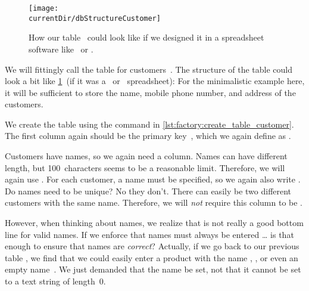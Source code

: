 %
%
%
\begin{figure}%
\centering%
\texttt{[image: \\currentDir/dbStructureCustomer]}%
\caption{How our table~ could look like if we designed it in a spreadsheet software like \microsoftExcel\ or \libreofficeCalc.}%
\label{fig:dbStructureCustomer}%
\end{figure}%
%
%
%
%
We will fittingly call the table for customers~.
The structure of the table could look a bit like \cref{fig:dbStructureCustomer}~(if it was a \microsoftExcel\ or \libreofficeCalc\ spreadsheet):
For the minimalistic example here, it will be sufficient to store the name, mobile phone number, and address of the customers.%
%
\begin{sloppypar}%
We create the table  using the  command in \cref{lst:factory:create_table_customer}.
The first column again should be the primary key~, which we again define as .
\end{sloppypar}%
%
Customers have names, so we again need a  column.
Names can have different length, but 100~characters seems to be a reasonable limit.
Therefore, we will again use .
For each customer, a name must be specified, so we again also write .
Do names need to be unique?
No they don't.
There can easily be two different customers with the same name.
Therefore, we will \emph{not} require this column to be .

However, when thinking about names, we realize that  is not really a good bottom line for valid names.
If we enforce that names must always be entered {\dots} is that enough to ensure that names are \emph{correct}?
Actually, if we go back to our previous table , we find that we could easily enter a product with the name , , or even an empty name~.
We just demanded that the name be set, not that it cannot be set to a text string of length~0.

